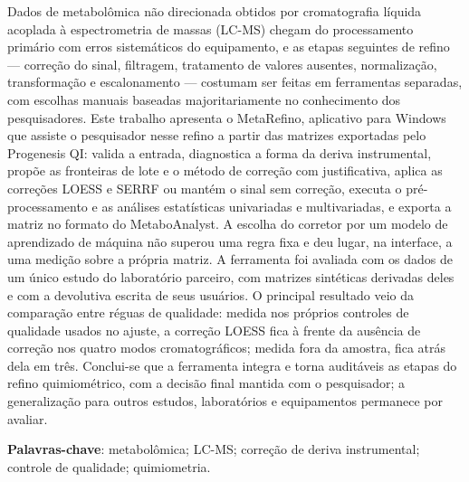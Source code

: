
\setlength{\absparsep}{18pt} %
\begin{resumo}[Resumo]

 Dados de metabolômica não direcionada obtidos por cromatografia líquida acoplada à espectrometria de massas (LC-MS) chegam do processamento primário com erros sistemáticos do equipamento, e as etapas seguintes de refino — correção do sinal, filtragem, tratamento de valores ausentes, normalização, transformação e escalonamento — costumam ser feitas em ferramentas separadas, com escolhas manuais baseadas majoritariamente no conhecimento dos pesquisadores. Este trabalho apresenta o MetaRefino, aplicativo para Windows que assiste o pesquisador nesse refino a partir das matrizes exportadas pelo Progenesis QI: valida a entrada, diagnostica a forma da deriva instrumental, propõe as fronteiras de lote e o método de correção com justificativa, aplica as correções LOESS e SERRF ou mantém o sinal sem correção, executa o pré-processamento e as análises estatísticas univariadas e multivariadas, e exporta a matriz no formato do MetaboAnalyst. A escolha do corretor por um modelo de aprendizado de máquina não superou uma regra fixa e deu lugar, na interface, a uma medição sobre a própria matriz. A ferramenta foi avaliada com os dados de um único estudo do laboratório parceiro, com matrizes sintéticas derivadas deles e com a devolutiva escrita de seus usuários. O principal resultado veio da comparação entre réguas de qualidade: medida nos próprios controles de qualidade usados no ajuste, a correção LOESS fica à frente da ausência de correção nos quatro modos cromatográficos; medida fora da amostra, fica atrás dela em três. Conclui-se que a ferramenta integra e torna auditáveis as etapas do refino quimiométrico, com a decisão final mantida com o pesquisador; a generalização para outros estudos, laboratórios e equipamentos permanece por avaliar.
\vspace{\onelineskip}

 \noindent
 \textbf{Palavras-chave}: metabolômica; LC-MS; correção de deriva instrumental; controle de qualidade; quimiometria.
\end{resumo}


